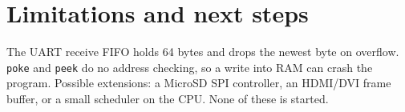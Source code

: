 \documentclass[11pt,a4paper]{article}
\begin{document}
\section{Limitations and next steps}
The UART receive FIFO holds 64 bytes and drops the newest byte on overflow. \texttt{poke} and \texttt{peek} do no address checking, so a write into RAM can crash the program.
Possible extensions: a MicroSD SPI controller, an HDMI/DVI frame buffer, or a small scheduler on the CPU. None of these is started.
\end{document}
